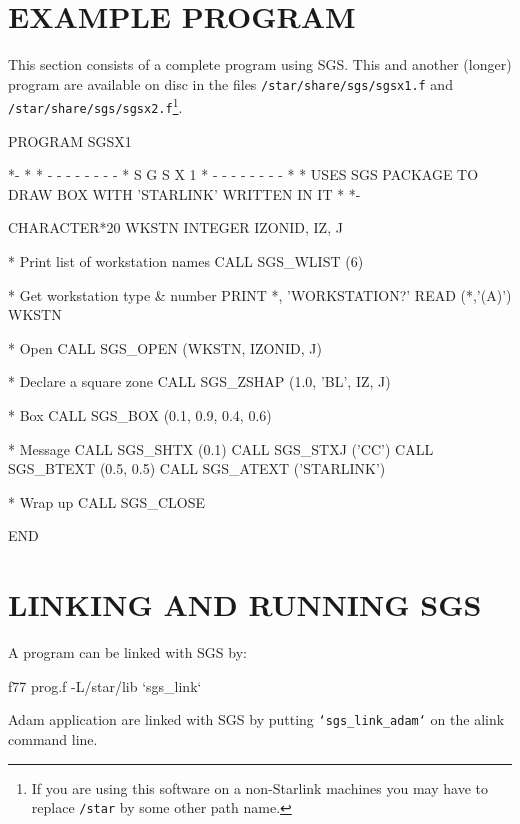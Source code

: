 \documentclass[11pt]{starlink}
\begin{document}
\section {EXAMPLE PROGRAM}\label{sec-example}

This section consists of a complete program using SGS.  This
and another (longer) program are available on disc in the
files \texttt{/star/share/sgs/sgsx1.f} and
\texttt{/star/share/sgs/sgsx2.f}\footnote{If you are using this
software on a non-Starlink machines you may have to replace \texttt{/star} by some
other path name.}.
\begin{terminalv}
      PROGRAM SGSX1

*-
*
*     - - - - - - - -
*        S G S X 1
*     - - - - - - - -
*
*     USES SGS PACKAGE TO DRAW BOX WITH 'STARLINK' WRITTEN IN IT
*
*-

      CHARACTER*20 WKSTN
      INTEGER IZONID, IZ, J

*  Print list of workstation names
      CALL SGS_WLIST (6)

*  Get workstation type & number
      PRINT *, 'WORKSTATION?'
      READ (*,'(A)') WKSTN

*  Open
      CALL SGS_OPEN (WKSTN, IZONID, J)

*  Declare a square zone
      CALL SGS_ZSHAP (1.0, 'BL', IZ, J)

*  Box
      CALL SGS_BOX (0.1, 0.9, 0.4, 0.6)

*  Message
      CALL SGS_SHTX (0.1)
      CALL SGS_STXJ ('CC')
      CALL SGS_BTEXT (0.5, 0.5)
      CALL SGS_ATEXT ('STARLINK')

*  Wrap up
      CALL SGS_CLOSE

      END
\end{terminalv}

\appendix
\section {LINKING AND RUNNING SGS}\label{app-linking}

A program can be linked with SGS by:
\begin{terminalv}
f77 prog.f -L/star/lib `sgs_link`
\end{terminalv}
Adam application are linked with SGS by putting \texttt{`sgs\_link\_adam`} on
the alink command line.
\end{document}
